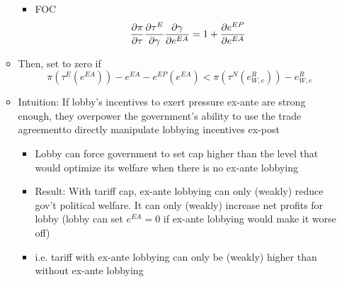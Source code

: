 \begin{itemize}
\begin{itemize}
					\begin{itemize}
						\item FOC
							\begin{equation}
							  \frac{\partial \pi}{\partial \tau} \frac{\partial \tau^E}{\partial \gamma} \frac{\partial \gamma}{\partial e^{EA}} = 1 +\frac{\partial e^{EP}}{\partial e^{EA}}
								\label{eq:ea}
							\end{equation}
					\end{itemize}
			\item Then, set to zero if
			  \begin{equation}
				  \pi(\tau^E(e^{EA})) - e^{EA} - e^{EP}(e^{EA}) < \pi(\tau^N(e^R_{W,e})) - e^R_{W,e} 
					\label{ine:ea}
				\end{equation}
			\item Intuition: If lobby's incentives to exert pressure ex-ante are strong enough, they overpower the government's ability to use the trade agreementto directly manipulate lobbying incentives ex-post
				\begin{itemize}
					\item Lobby can force government to set cap higher than the level that would optimize its welfare when there is no ex-ante lobbying
					\item Result: With tariff cap, ex-ante lobbying can only (weakly) reduce gov't political welfare. It can only (weakly) increase net profits for lobby (lobby can set $e^{EA}=0$ if ex-ante lobbying would make it worse off)
					\item i.e. tariff with ex-ante lobbying can only be (weakly) higher than without ex-ante lobbying
				\end{itemize}	
		\end{itemize}	
\end{itemize}	
				
